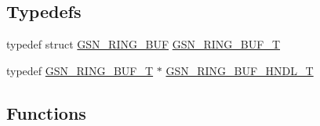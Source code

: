 \subsection*{Typedefs}
\begin{DoxyCompactItemize}
\item 
typedef struct \hyperlink{a00191}{GSN\_\-RING\_\-BUF} \hyperlink{a00632_gaca5ec9760102d4664831e7f6614766bc}{GSN\_\-RING\_\-BUF\_\-T}
\item 
typedef \hyperlink{a00191}{GSN\_\-RING\_\-BUF\_\-T} $\ast$ \hyperlink{a00578_a33e5a462afbc26ddf2d6e33a4d0a80eb}{GSN\_\-RING\_\-BUF\_\-HNDL\_\-T}
\end{DoxyCompactItemize}
\subsection*{Functions}
